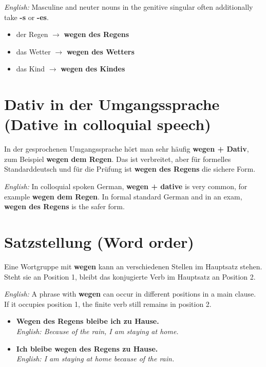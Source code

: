 \documentclass[a4paper]{article}
\begin{document}
   \textit{English:} Masculine and neuter nouns in the genitive singular often additionally take \textbf{-s} or \textbf{-es}.

   \begin{itemize}
      \item der Regen $\rightarrow$ \textbf{wegen des Regens}
      \item das Wetter $\rightarrow$ \textbf{wegen des Wetters}
      \item das Kind $\rightarrow$ \textbf{wegen des Kindes}
   \end{itemize}

   \section{Dativ in der Umgangssprache \textnormal{(Dative in colloquial speech)}}

   In der gesprochenen Umgangssprache hört man sehr häufig \textbf{wegen + Dativ}, zum Beispiel \textbf{wegen dem Regen}. Das ist verbreitet, aber für formelles Standarddeutsch und für die Prüfung ist \textbf{wegen des Regens} die sichere Form.

   \textit{English:} In colloquial spoken German, \textbf{wegen + dative} is very common, for example \textbf{wegen dem Regen}. In formal standard German and in an exam, \textbf{wegen des Regens} is the safer form.

   \section{Satzstellung \textnormal{(Word order)}}

   Eine Wortgruppe mit \textbf{wegen} kann an verschiedenen Stellen im Hauptsatz stehen. Steht sie an Position 1, bleibt das konjugierte Verb im Hauptsatz an Position 2.

   \textit{English:} A phrase with \textbf{wegen} can occur in different positions in a main clause. If it occupies position 1, the finite verb still remains in position 2.

   \begin{itemize}
      \item \textbf{Wegen des Regens bleibe ich zu Hause.}\\
      \textit{English: Because of the rain, I am staying at home.}
      \item \textbf{Ich bleibe wegen des Regens zu Hause.}\\
      \textit{English: I am staying at home because of the rain.}
   \end{itemize}
\end{document}
